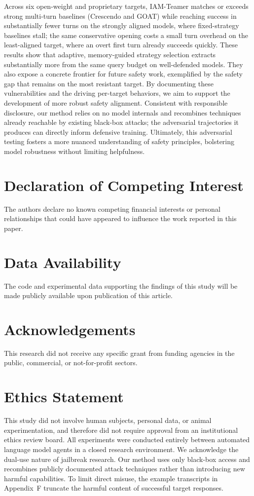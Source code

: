 \documentclass[a4paper,fleqn]{cas-sc}
\begin{document}
Across six open-weight and proprietary targets, IAM-Teamer matches or exceeds strong multi-turn baselines (Crescendo and GOAT) while reaching success in substantially fewer turns on the strongly aligned models, where fixed-strategy baselines stall; the same conservative opening costs a small turn overhead on the least-aligned target, where an overt first turn already succeeds quickly.
These results show that adaptive, memory-guided strategy selection extracts substantially more from the same query budget on well-defended models. They also expose a concrete frontier for future safety work, exemplified by the safety gap that remains on the most resistant target.
By documenting these vulnerabilities and the driving per-target behaviors, we aim to support the development of more robust safety alignment.
Consistent with responsible disclosure, our method relies on no model internals and recombines techniques already reachable by existing black-box attacks; the adversarial trajectories it produces can directly inform defensive training.
Ultimately, this adversarial testing fosters a more nuanced understanding of safety principles, bolstering model robustness without limiting helpfulness.
\section*{Declaration of Competing Interest}
The authors declare no known competing financial interests or personal relationships that could have appeared to influence the work reported in this paper.

\section*{Data Availability}
The code and experimental data supporting the findings of this study will be made publicly available upon publication of this article.

\section*{Acknowledgements}
This research did not receive any specific grant from funding agencies in the public, commercial, or not-for-profit sectors.

\section*{Ethics Statement}
This study did not involve human subjects, personal data, or animal experimentation, and therefore did not require approval from an institutional ethics review board.
All experiments were conducted entirely between automated language model agents in a closed research environment.
We acknowledge the dual-use nature of jailbreak research. Our method uses only black-box access and recombines publicly documented attack techniques rather than introducing new harmful capabilities. To limit direct misuse, the example transcripts in Appendix~F truncate the harmful content of successful target responses.
\end{document}
